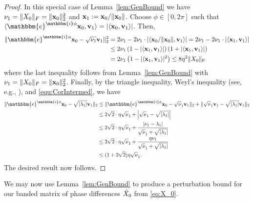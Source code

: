 \begin{proof}
In this special case of Lemma~\ref{lem:GenBound} we have $\nu_1 = \Vert X_0 \Vert_F = \Vert \mathbf x_0\Vert_2^2$ and $\mathbf x_1 := \mathbf x_0 / \Vert \mathbf x_0 \Vert$.  Choose $\phi \in [0, 2 \pi]$ such that $\langle \mathbbm{e}^{\mathbbm{i} \phi} \x_0, \v_1 \rangle  = \vert \langle  \x_0, \v_1 \rangle \vert$.  Then, 
%
\begin{align}
 \Vert \mathbbm{e}^{\mathbbm{i} \phi} \x_0 - \sqrt{\nu_1} \v_1 \Vert_2^2 &= 2\nu_1 - 2 \nu_1  \cdot \vert \langle  \x_0 / \Vert \x_0 \Vert, \v_1 \rangle \vert = 2\nu_1 - 2 \nu_1  \cdot \vert \langle  \x_1, \v_1 \rangle \vert \nonumber \\ &\leq 2 \nu_1 \left( 1 - \vert \langle  \x_1, \v_1 \rangle \vert \right) \left( 1 + \vert \langle  \x_1, \v_1 \rangle \vert \right) \label{equ:CorIntermed} \\ &= 2 \nu_1 \left( 1 - | \langle \x_1, \v_1 \rangle |^2 \right) \leq 8 \eta^2 \Vert \X_0 \Vert_{\rm F} \nonumber
\end{align}
where the last inequality follows from Lemma~\ref{lem:GenBound} with $\nu_1 = \Vert X_0 \Vert_F = \Vert \mathbf x_0\Vert_2^2$.  Finally, by the triangle inequality, Weyl's inequality (see, e.g., \cite{horn2012matrix}), and \eqref{equ:CorIntermed}, we have
\begin{align*}
  \Vert \mathbbm{e}^{\mathbbm{i} \phi} \x_0 - \sqrt{ |\lambda_1|} \v_1 \Vert_2 & \leq \Vert 
    \mathbbm{e}^{\mathbbm{i} \phi} \x_0 -\sqrt \nu_1 \v_1 \Vert_2 + \Vert \sqrt \nu_1 \v_1 - 
    \sqrt{|\lambda_1|} \v_1 \Vert_2 \\
    & \leq 2 \sqrt{2} \cdot \eta \sqrt \nu_1 + \left \vert \sqrt \nu_1 - \sqrt{|\lambda_1|} \right \vert \\ & \leq 2 \sqrt{2} \cdot \eta \sqrt 
        \nu_1 + \frac{| \nu_1 - \lambda_1 |}{\sqrt \nu_1 + \sqrt{|\lambda_1|}} \\
     & \leq 2 \sqrt{2} \cdot \eta \sqrt \nu_1 + \frac{\eta \nu_1}{\sqrt \nu_1 + \sqrt{|\lambda_1|}}\\ 
    & \leq (1+2 \sqrt{2}) \eta \sqrt \nu_1.
\end{align*}
The desired result now follows.
\end{proof}

We may now use Lemma~\ref{lem:GenBound} to produce a perturbation bound for our banded matrix of phase differences $\tilde{X}_0$ from \eqref{eq:X_0}.

